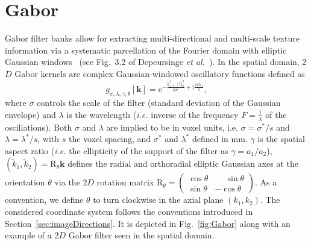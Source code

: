 \documentclass[fleqn,a4paper,oneside,openany]{book}
\begin{document}
\section{Gabor}\label{sec:Gabor}
%
Gabor filter banks allow for extracting multi-directional and multi-scale texture information via a systematic parcellation of the Fourier domain with elliptic Gaussian windows~\cite{Bianconi2007} (see Fig.~3.2 of Depeursinge \textit{et al.}~\cite{DeF2017}).
In the spatial domain, 2$D$ Gabor kernels are complex Gaussian-windowed oscillatory functions defined as
%
\begin{equation}\label{eq:Gabor2D}
g_{\sigma,\lambda,\gamma,\theta}[\boldsymbol{k}]=
\mathrm{e}^{
-\frac{
\tilde{k}_1^2 +
\gamma^2\tilde{k}_2^2
}
{2\sigma^2}
+\mathrm{j}\frac{2\pi\tilde{k}_1}{\lambda}}
,
\end{equation}
%
where $\sigma$ controls the scale of the filter (standard deviation of the Gaussian envelope) and $\lambda$ is the wavelength (\textit{i.e.} inverse of the frequency $F=\frac{1}{\lambda}$ of the oscillations). Both $\sigma$ and $\lambda$ are implied to be in voxel units, i.e. $\sigma = \sigma^* / s$ and $\lambda = \lambda^* / s$, with $s$ the voxel spacing, and $\sigma^*$ and $\lambda^*$ defined in mm.
$\gamma$ is the spatial aspect ratio (\textit{i.e.} the ellipticity of the support of the filter as $\gamma=a_1/a_2$), \mbox{$(\tilde{k}_1,\tilde{k}_2) =  \mathrm{R}_{\theta} \boldsymbol{k}$} defines the radial and orthoradial elliptic Gaussian axes at the orientation $\theta$ via the 2$D$ rotation matrix \mbox{$\mathrm{R}_{\theta} = 
\left(\begin{matrix}
\cos\theta &  \phantom{+}\sin\theta \\
\sin\theta & - \cos\theta
\end{matrix}
\right)$}.
As a convention, we define $\theta$ to turn clockwise in the axial plane $(k_1,k_2)$.
The considered coordinate system follows the conventions introduced in Section~\ref{sec:imageDirections}. 
It is depicted in Fig.~\ref{fig:Gabor} along with an example of a 2$D$ Gabor filter seen in the spatial domain.
\end{document}
